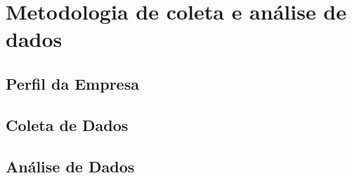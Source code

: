 
\section{Metodologia de coleta e análise de dados}
\label{chapter:METODOLOGIA}

\subsection{Perfil da Empresa}
\label{subsection:perfil_empresa}

\subsection{Coleta de Dados}
\label{subsection:coleta_dados}


\subsection{Análise de Dados}
\label{subsection:analise_dados}










